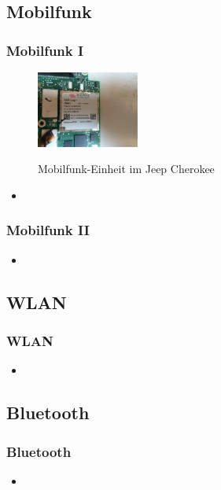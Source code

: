 \documentclass[t]{beamer}
\begin{document}
 \subsection{Mobilfunk} %
 \begin{frame}
	\frametitle{Mobilfunk I}
    \begin{center}
        \begin{figure}
            \includegraphics[width=0.3\textwidth]{pic/001_cellular.jpg}
            \caption[Mobilfunk]{Mobilfunk-Einheit im Jeep Cherokee}
            \cite{Quelle}
        \end{figure}
	\end{center}
    \begin{itemize}
		\item
    \end{itemize}
\end{frame}

\begin{frame}
	\frametitle{Mobilfunk II}
    \begin{itemize}
		\item
    \end{itemize}
\end{frame}


 \subsection{WLAN} %
 \begin{frame}
	\frametitle{WLAN}
    \begin{itemize}
		\item
    \end{itemize}
\end{frame}
 \subsection{Bluetooth} %

\begin{frame}
	\frametitle{Bluetooth}
    \begin{itemize}
		\item
    \end{itemize}
\end{frame}
\end{document}
